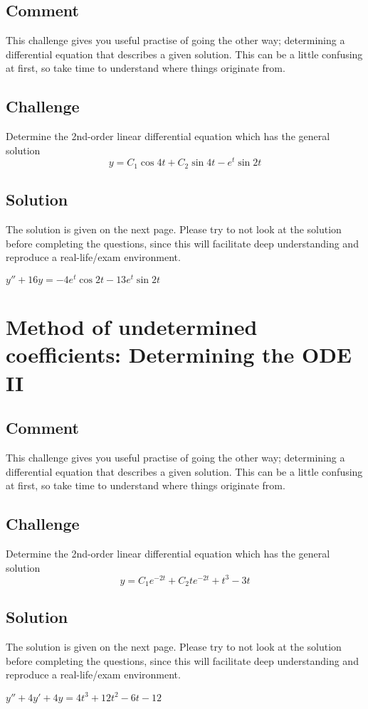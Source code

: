 \subsection*{Comment}
This challenge gives you useful practise of going the other way; determining a differential equation that describes a given solution. This can be a little confusing at first, so take time to understand where things originate from.

\subsection*{Challenge}
Determine the 2nd-order linear differential equation which has the general solution
\begin{equation}
    y = C_1 \cos 4t + C_2 \sin 4t - e^t \sin 2t
\end{equation}

\subsection*{Solution}
The solution is given on the next page. Please try to not look at the solution before completing the questions, since this will facilitate deep understanding and reproduce a real-life/exam environment.
\newpage

$y'' + 16y = -4 e^t \cos 2t - 13 e^t \sin 2t$




\newpage
\section{Method of undetermined coefficients: Determining the ODE II}

\subsection*{Comment}
This challenge gives you useful practise of going the other way; determining a differential equation that describes a given solution. This can be a little confusing at first, so take time to understand where things originate from.

\subsection*{Challenge}
Determine the 2nd-order linear differential equation which has the general solution
\begin{equation}
    y = C_1 e^{-2t} + C_2 t e^{-2t} + t^3 - 3t
\end{equation}

\subsection*{Solution}
The solution is given on the next page. Please try to not look at the solution before completing the questions, since this will facilitate deep understanding and reproduce a real-life/exam environment.
\newpage

$y'' + 4y' + 4y = 4t^3 + 12 t^2 - 6t - 12$
\fi
